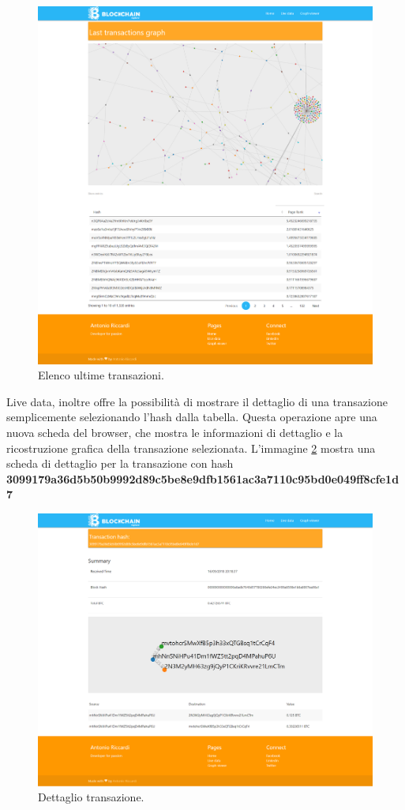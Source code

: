 \begin{figure}[H]
	\centering
	\includegraphics[width=\textwidth, height=0.70\textheight]{images/graphView.png}
	\caption{Elenco ultime transazioni.}
	\label{fig:transactionsBE}
\end{figure}
Live data, inoltre offre la possibilità di mostrare il dettaglio di una transazione semplicemente selezionando l'hash dalla tabella. Questa operazione apre una nuova scheda del browser, che mostra le informazioni di dettaglio e la ricostruzione grafica della transazione selezionata. L'immagine \ref{fig:detailBE} mostra una scheda di dettaglio per la transazione con hash \textbf{3099179a36d5b50b9992d89c5be8e9dfb1561ac3a7110c95bd0e049ff8cfe1d7}
\begin{figure}[H]
	\centering
	\includegraphics[width=\textwidth, height=0.70\textheight]{images/infoTransaction2.png}
	\caption{Dettaglio transazione.}
	\label{fig:detailBE}
\end{figure}
